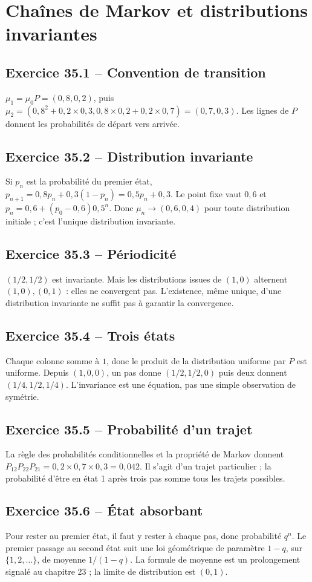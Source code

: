 \chapter{Chaînes de Markov et distributions invariantes}
\section*{Exercice 35.1 -- Convention de transition}
$\mu_1=\mu_0P=(0{,}8,0{,}2)$, puis $\mu_2=(0{,}8^2+0{,}2\times0{,}3,0{,}8\times0{,}2+0{,}2\times0{,}7)=(0{,}7,0{,}3)$. Les lignes de $P$ donnent les probabilités de départ vers arrivée.

\section*{Exercice 35.2 -- Distribution invariante}
Si $p_n$ est la probabilité du premier état, $p_{n+1}=0{,}8p_n+0{,}3(1-p_n)=0{,}5p_n+0{,}3$. Le point fixe vaut $0{,}6$ et $p_n=0{,}6+(p_0-0{,}6)0{,}5^n$. Donc $\mu_n\to(0{,}6,0{,}4)$ pour toute distribution initiale ; c'est l'unique distribution invariante.

\section*{Exercice 35.3 -- Périodicité}
$(1/2,1/2)$ est invariante. Mais les distributions issues de $(1,0)$ alternent $(1,0),(0,1)$ : elles ne convergent pas. L'existence, même unique, d'une distribution invariante ne suffit pas à garantir la convergence.

\section*{Exercice 35.4 -- Trois états}
Chaque colonne somme à $1$, donc le produit de la distribution uniforme par $P$ est uniforme. Depuis $(1,0,0)$, un pas donne $(1/2,1/2,0)$ puis deux donnent $(1/4,1/2,1/4)$. L'invariance est une équation, pas une simple observation de symétrie.

\section*{Exercice 35.5 -- Probabilité d’un trajet}
La règle des probabilités conditionnelles et la propriété de Markov donnent $P_{12}P_{22}P_{21}=0{,}2\times0{,}7\times0{,}3=0{,}042$. Il s'agit d'un trajet particulier ; la probabilité d'être en état 1 après trois pas somme tous les trajets possibles.

\section*{Exercice 35.6 -- État absorbant}
Pour rester au premier état, il faut y rester à chaque pas, donc probabilité $q^n$. Le premier passage au second état suit une loi géométrique de paramètre $1-q$, sur $\{1,2,\ldots\}$, de moyenne $1/(1-q)$. La formule de moyenne est un prolongement signalé au chapitre 23 ; la limite de distribution est $(0,1)$.
